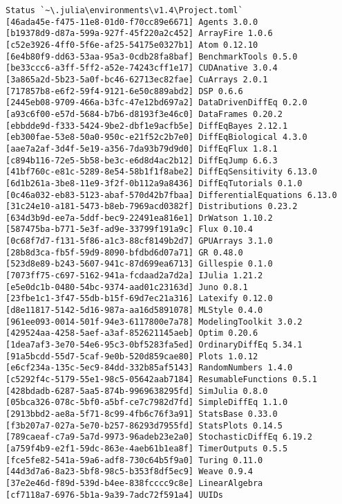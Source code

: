 \documentclass[12pt,a4paper]{article}
\begin{document}
\begin{verbatim}
Status `~\.julia\environments\v1.4\Project.toml`
[46ada45e-f475-11e8-01d0-f70cc89e6671] Agents 3.0.0
[b19378d9-d87a-599a-927f-45f220a2c452] ArrayFire 1.0.6
[c52e3926-4ff0-5f6e-af25-54175e0327b1] Atom 0.12.10
[6e4b80f9-dd63-53aa-95a3-0cdb28fa8baf] BenchmarkTools 0.5.0
[be33ccc6-a3ff-5ff2-a52e-74243cff1e17] CUDAnative 3.0.4
[3a865a2d-5b23-5a0f-bc46-62713ec82fae] CuArrays 2.0.1
[717857b8-e6f2-59f4-9121-6e50c889abd2] DSP 0.6.6
[2445eb08-9709-466a-b3fc-47e12bd697a2] DataDrivenDiffEq 0.2.0
[a93c6f00-e57d-5684-b7b6-d8193f3e46c0] DataFrames 0.20.2
[ebbdde9d-f333-5424-9be2-dbf1e9acfb5e] DiffEqBayes 2.12.1
[eb300fae-53e8-50a0-950c-e21f52c2b7e0] DiffEqBiological 4.3.0
[aae7a2af-3d4f-5e19-a356-7da93b79d9d0] DiffEqFlux 1.8.1
[c894b116-72e5-5b58-be3c-e6d8d4ac2b12] DiffEqJump 6.6.3
[41bf760c-e81c-5289-8e54-58b1f1f8abe2] DiffEqSensitivity 6.13.0
[6d1b261a-3be8-11e9-3f2f-0b112a9a8436] DiffEqTutorials 0.1.0
[0c46a032-eb83-5123-abaf-570d42b7fbaa] DifferentialEquations 6.13.0
[31c24e10-a181-5473-b8eb-7969acd0382f] Distributions 0.23.2
[634d3b9d-ee7a-5ddf-bec9-22491ea816e1] DrWatson 1.10.2
[587475ba-b771-5e3f-ad9e-33799f191a9c] Flux 0.10.4
[0c68f7d7-f131-5f86-a1c3-88cf8149b2d7] GPUArrays 3.1.0
[28b8d3ca-fb5f-59d9-8090-bfdbd6d07a71] GR 0.48.0
[523d8e89-b243-5607-941c-87d699ea6713] Gillespie 0.1.0
[7073ff75-c697-5162-941a-fcdaad2a7d2a] IJulia 1.21.2
[e5e0dc1b-0480-54bc-9374-aad01c23163d] Juno 0.8.1
[23fbe1c1-3f47-55db-b15f-69d7ec21a316] Latexify 0.12.0
[d8e11817-5142-5d16-987a-aa16d5891078] MLStyle 0.4.0
[961ee093-0014-501f-94e3-6117800e7a78] ModelingToolkit 3.0.2
[429524aa-4258-5aef-a3af-852621145aeb] Optim 0.20.6
[1dea7af3-3e70-54e6-95c3-0bf5283fa5ed] OrdinaryDiffEq 5.34.1
[91a5bcdd-55d7-5caf-9e0b-520d859cae80] Plots 1.0.12
[e6cf234a-135c-5ec9-84dd-332b85af5143] RandomNumbers 1.4.0
[c5292f4c-5179-55e1-98c5-05642aab7184] ResumableFunctions 0.5.1
[428bdadb-6287-5aa5-874b-9969638295fd] SimJulia 0.8.0
[05bca326-078c-5bf0-a5bf-ce7c7982d7fd] SimpleDiffEq 1.1.0
[2913bbd2-ae8a-5f71-8c99-4fb6c76f3a91] StatsBase 0.33.0
[f3b207a7-027a-5e70-b257-86293d7955fd] StatsPlots 0.14.5
[789caeaf-c7a9-5a7d-9973-96adeb23e2a0] StochasticDiffEq 6.19.2
[a759f4b9-e2f1-59dc-863e-4aeb61b1ea8f] TimerOutputs 0.5.5
[fce5fe82-541a-59a6-adf8-730c64b5f9a0] Turing 0.11.0
[44d3d7a6-8a23-5bf8-98c5-b353f8df5ec9] Weave 0.9.4
[37e2e46d-f89d-539d-b4ee-838fcccc9c8e] LinearAlgebra
[cf7118a7-6976-5b1a-9a39-7adc72f591a4] UUIDs
\end{verbatim}
\end{document}
